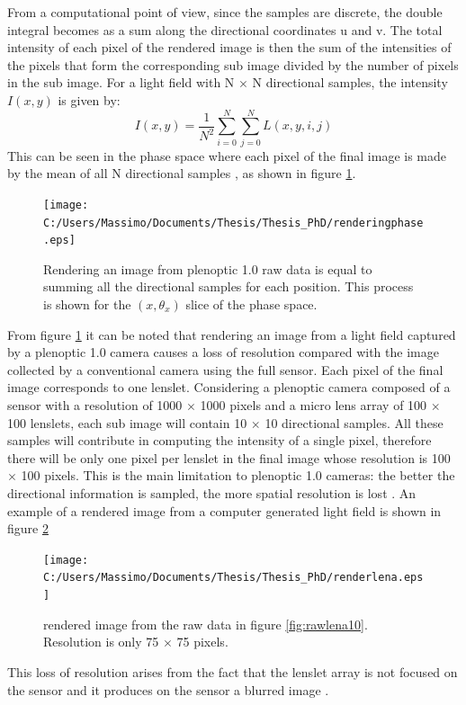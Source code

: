 From a computational point of view, since the samples are discrete, the double integral becomes as a sum along the directional coordinates u and v. The total intensity of each pixel of the rendered image is then the sum of the intensities of the pixels that form the corresponding sub image divided by the number of pixels in the sub image. For a light field with N $\times$ N directional samples, the intensity $I(x,y)$ is given by:
\begin{equation}
\label{eq:rendering3}
I(x,y) = \dfrac{1}{N^2}\sum_{i=0}^N\sum_{j=0}^N L(x,y,i,j)
\end{equation}
This can be seen in the phase space where each pixel of the final image is made by the mean of all N directional samples \cite{georgiev2010focused}, as shown in figure \ref{fig:rendering2}.
 \begin{figure}[H]
 	\centering
 	\texttt{[image: C:/Users/Massimo/Documents/Thesis/Thesis\_PhD/renderingphase.eps]}
 	\caption{\label{fig:rendering2} Rendering an image from plenoptic 1.0 raw data is equal to summing all the directional samples for each position. This process is shown for the $(x,\theta_x)$ slice of the phase space. \cite{georgiev2010focused} }
 \end{figure}
 From figure \ref{fig:rendering2} it can be noted that rendering an image from a light field captured by a plenoptic 1.0 camera causes a loss of resolution compared with the image collected by a conventional camera using the full sensor. Each pixel of the final image corresponds to one lenslet. Considering a plenoptic camera composed of a sensor with a resolution of 1000 $\times$ 1000 pixels and a micro lens array of 100 $\times$ 100 lenslets, each sub image will contain 10 $\times$ 10 directional samples. All these samples will contribute in computing the intensity of a single pixel, therefore there will be only one pixel per lenslet in the final image whose resolution is 100 $\times$ 100 pixels. This is the main limitation to plenoptic 1.0 cameras: the better the directional information is sampled, the more spatial resolution is lost \cite{georgiev2010focused, ng2006digital}. An example of a rendered image from a computer generated light field is shown in figure \ref{fig:renderlena}
 \begin{figure}[H]
 	\centering
 	\texttt{[image: C:/Users/Massimo/Documents/Thesis/Thesis\_PhD/renderlena.eps]}
 	\caption{\label{fig:renderlena} rendered image from the raw data in figure \ref{fig:rawlena10}. Resolution is only 75 $\times$ 75 pixels.  }
 \end{figure}
 This loss of resolution arises from the fact that the lenslet array is not focused on the sensor and it produces on the sensor a blurred image \cite{georgiev2010focused}.
